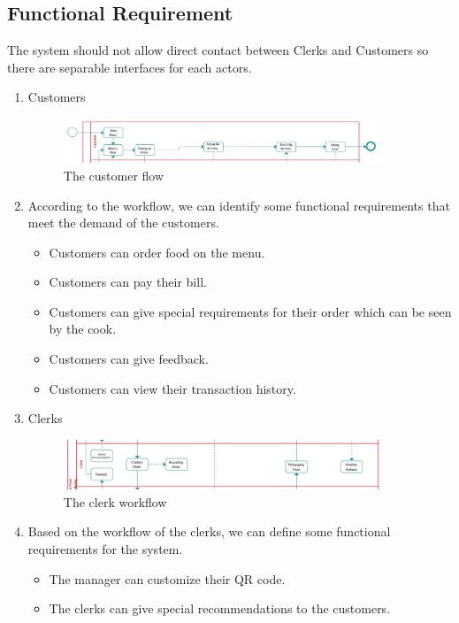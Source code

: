 \subsection{Functional Requirement}
The system should not allow direct contact between Clerks and Customers so there are separable interfaces for each actors.
\begin{enumerate}
  \item{Customers}
  \begin{figure}[H]
    \centering
    \includegraphics[width=0.9\textwidth]{./assets/t1/Customer_flow.png}
    \caption{The customer flow}
  \end{figure}
  \item[]According to the workflow, we can identify some functional requirements that meet the demand of the customers.
  \begin{itemize}
    \item Customers can order food on the menu.
    \item Customers can pay their bill.
    \item Customers can give special requirements for their order which can be seen by the cook.
    \item Customers can give feedback.
    \item Customers can view their transaction history.
  \end{itemize}
  \item{Clerks}
  \begin{figure}[H]
    \centering
    \includegraphics[width=0.9\textwidth]{./assets/t1/Clerk_workflow.png}
    \caption{The clerk workflow}
  \end{figure}
  \item[]Based on the workflow of the clerks, we can define some functional requirements for the system.
  \begin{itemize}
    \item The manager can customize their QR code.
    \item The clerks can give special recommendations to the customers.
  \end{itemize}
\end{enumerate}

